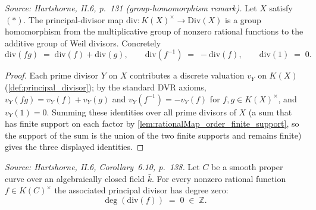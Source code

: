 \begin{theorem}
  \label{thm:principal_hom}
  \textit{Source: Hartshorne, II.6, p.~131 (group-homomorphism remark).}
  Let \(X\) satisfy \((*)\). The principal-divisor map
  \(\mathrm{div} \colon K(X)^{\times} \to \mathrm{Div}(X)\) is a group homomorphism from the
  multiplicative group of nonzero rational functions to the additive group
  of Weil divisors. Concretely
  \[
    \mathrm{div}(fg) \;=\; \mathrm{div}(f) + \mathrm{div}(g),
    \qquad
    \mathrm{div}(f^{-1}) \;=\; -\mathrm{div}(f),
    \qquad
    \mathrm{div}(1) \;=\; 0.
  \]
\end{theorem}
\begin{proof}
  Each prime divisor \(Y\) on \(X\) contributes a discrete valuation \(v_Y\) on
  \(K(X)\) (\ref{def:principal_divisor}); by the standard DVR axioms,
  \(v_Y(fg) = v_Y(f) + v_Y(g)\) and \(v_Y(f^{-1}) = -v_Y(f)\) for $f, g \in
  K(X)^{\times}$, and $v_Y(1) = 0$. Summing these identities over all prime
  divisors of \(X\) (a sum that has finite support on each factor by
  \ref{lem:rationalMap_order_finite_support}, so the support of the sum is the union
  of the two finite supports and remains finite) gives the three displayed
  identities.
\end{proof}
\begin{theorem}
  \label{thm:principal_deg_zero}
  \textit{Source: Hartshorne, II.6, Corollary~6.10, p.~138.}
  Let \(C\) be a smooth proper curve over an algebraically closed field
  \(\bar k\). For every nonzero rational function \(f \in K(C)^{\times}\) the
  associated principal divisor has degree zero:
  \[
    \deg(\mathrm{div}(f)) \;=\; 0 \;\in\; \mathbb Z.
  \]
\end{theorem}

